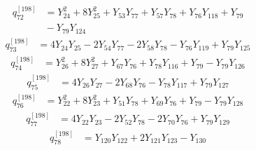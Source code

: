 \begin{equation}\label{q198:row:072}
\begin{aligned}
q_{72}^{[198]} &={} Y_{24}^{2} + 8Y_{25}^{2} + Y_{53}Y_{77} + Y_{57}Y_{78} + Y_{76}Y_{118} + Y_{79}\\
&{} - Y_{79}Y_{124}
\end{aligned}
\end{equation}
\begin{equation}\label{q198:row:073}
\begin{aligned}
q_{73}^{[198]} &={} 4Y_{24}Y_{25} - 2Y_{54}Y_{77} - 2Y_{58}Y_{78} - Y_{76}Y_{119} + Y_{79}Y_{125}
\end{aligned}
\end{equation}
\begin{equation}\label{q198:row:074}
\begin{aligned}
q_{74}^{[198]} &={} Y_{26}^{2} + 8Y_{27}^{2} + Y_{67}Y_{76} + Y_{78}Y_{116} + Y_{79} - Y_{79}Y_{126}
\end{aligned}
\end{equation}
\begin{equation}\label{q198:row:075}
\begin{aligned}
q_{75}^{[198]} &={} 4Y_{26}Y_{27} - 2Y_{68}Y_{76} - Y_{78}Y_{117} + Y_{79}Y_{127}
\end{aligned}
\end{equation}
\begin{equation}\label{q198:row:076}
\begin{aligned}
q_{76}^{[198]} &={} Y_{22}^{2} + 8Y_{23}^{2} + Y_{51}Y_{78} + Y_{69}Y_{76} + Y_{79} - Y_{79}Y_{128}
\end{aligned}
\end{equation}
\begin{equation}\label{q198:row:077}
\begin{aligned}
q_{77}^{[198]} &={} 4Y_{22}Y_{23} - 2Y_{52}Y_{78} - 2Y_{70}Y_{76} + Y_{79}Y_{129}
\end{aligned}
\end{equation}
\begin{equation}\label{q198:row:078}
\begin{aligned}
q_{78}^{[198]} &={} Y_{120}Y_{122} + 2Y_{121}Y_{123} - Y_{130}
\end{aligned}
\end{equation}

